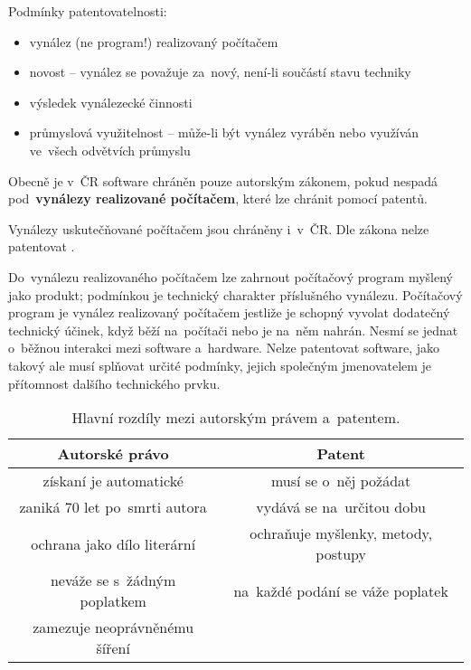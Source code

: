 \noindent Podmínky patentovatelnosti:
\begin{itemize}
	\item vynález (ne program!) realizovaný počítačem
	\item novost -- vynález se považuje za~nový, není-li součástí stavu techniky
	\item výsledek vynálezecké činnosti
	\item průmyslová využitelnost -- může-li být vynález vyráběn nebo využíván ve~všech odvětvích průmyslu
\end{itemize}

Obecně je v~ČR software chráněn pouze autorským zákonem, pokud nespadá pod~\textbf{vynálezy realizované počítačem}, které lze chránit pomocí patentů.

Vynálezy uskutečňované počítačem jsou chráněny i~v~ČR. Dle zákona nelze patentovat \emph{}.

Do~vynálezu realizovaného počítačem lze zahrnout počítačový program myšlený jako produkt; podmínkou je technický charakter příslušného vynálezu. Počítačový program je vynález realizovaný počítačem jestliže je schopný vyvolat dodatečný technický účinek, když běží na~počítači nebo je na~něm nahrán. Nesmí se jednat o~běžnou interakci mezi software a~hardware. Nelze patentovat software, jako takový ale musí splňovat určité podmínky, jejich společným jmenovatelem je přítomnost dalšího technického prvku.

\begin{table}[ht]
	\centering
	\caption{Hlavní rozdíly mezi autorským právem a~patentem.}

	\begin{tabular}{c|c}
	\textbf{Autorské právo}       & \textbf{Patent} \\
	\hline
	získaní je automatické        & musí se o~něj požádat \\
	zaniká 70 let po~smrti autora & vydává se na~určitou dobu \\
	ochrana jako dílo literární   & ochraňuje myšlenky, metody, postupy \\
	neváže se s~žádným poplatkem  & na~každé podání se váže poplatek \\
	zamezuje neoprávněnému šíření & \\
	\end{tabular}
\end{table}

\clearpage
